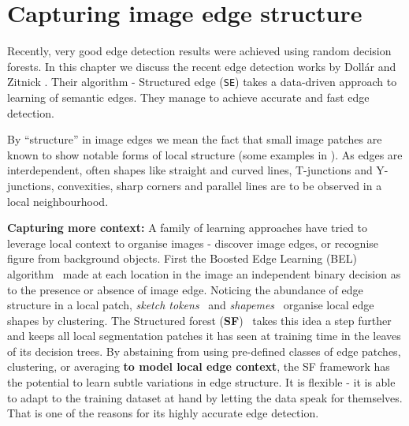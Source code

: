 \chapter{Capturing image edge structure} %
\label{Chapter2}
Recently, very good edge detection results were achieved using random decision forests. In this chapter we discuss the recent edge detection works by Doll\'ar and Zitnick \cite{DollarICCV13edges,Dollar2015PAMI}. Their algorithm - Structured edge ({\tt SE}) takes a data-driven approach to learning of semantic edges. %
They manage to achieve accurate and fast edge detection. %

By ``structure'' in image edges %
we mean the fact that small %
image patches are known \cite{Ren2006figure,LimZD13} to show %
notable %
forms of local structure (some examples in ). As edges are interdependent, often shapes like straight and curved lines, T-junctions and Y-junctions, convexities, sharp corners and parallel lines are to be observed in a local neighbourhood.

\textbf{Capturing more context:} A family of learning approaches have tried to leverage local context to organise images - discover image edges, or recognise %
figure from background objects. First the Boosted Edge Learning (BEL) algorithm~\cite{Dollar2006supervised} made at each location in the image an independent binary decision as to the presence or absence of image edge. Noticing the abundance of edge structure in a local patch, \textit{sketch tokens}~\cite{LimZD13} and \textit{shapemes}~\cite{Ren2006figure} organise local edge shapes by clustering. 
The Structured forest ({\bf SF})~\cite{DollarICCV13edges} takes this idea a step further and keeps all local segmentation patches it has seen at training time in the leaves of its decision trees. By abstaining from using pre-defined classes of edge patches, clustering, or averaging \textbf{to model local edge context}, the SF framework has the potential to learn subtle variations in edge structure. It is flexible - it is able to adapt to the training dataset at hand by letting the data speak for themselves. %
That is one of the reasons for its highly accurate edge detection.

